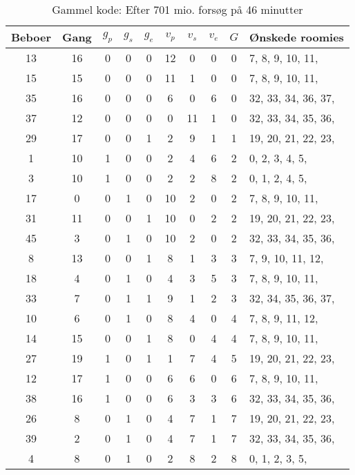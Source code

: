 \documentclass[article,oneside,11pt,a4paper]{memoir}
\newenvironment{assignment}[1]{
\begin{table}[h]
\caption{#1}
\footnotesize
\begin{center}
\begin{tabular}{cccccccccl}
\toprule
Beboer & Gang & $g_p$ & $g_s$ & $g_e$ & $v_p$ & $v_s$ & $v_e$ & $G$ & Ønskede roomies \\ \midrule
}{
\bottomrule
\end{tabular}
\end{center}
\end{table}

}
\begin{document}
\begin{assignment}{Gammel kode: Efter 701 mio. forsøg på 46 minutter}
    13 &   16 &   0 &   0 &   0 &  12 &   0 &   0 &  0 &   7,  8,  9, 10, 11, \\
    15 &   15 &   0 &   0 &   0 &  11 &   1 &   0 &  0 &   7,  8,  9, 10, 11, \\
    35 &   16 &   0 &   0 &   0 &   6 &   0 &   6 &  0 &  32, 33, 34, 36, 37, \\
    37 &   12 &   0 &   0 &   0 &   0 &  11 &   1 &  0 &  32, 33, 34, 35, 36, \\
    29 &   17 &   0 &   0 &   1 &   2 &   9 &   1 &  1 &  19, 20, 21, 22, 23, \\
     1 &   10 &   1 &   0 &   0 &   2 &   4 &   6 &  2 &   0,  2,  3,  4,  5, \\
     3 &   10 &   1 &   0 &   0 &   2 &   2 &   8 &  2 &   0,  1,  2,  4,  5, \\
    17 &    0 &   0 &   1 &   0 &  10 &   2 &   0 &  2 &   7,  8,  9, 10, 11, \\
    31 &   11 &   0 &   0 &   1 &  10 &   0 &   2 &  2 &  19, 20, 21, 22, 23, \\
    45 &    3 &   0 &   1 &   0 &  10 &   2 &   0 &  2 &  32, 33, 34, 35, 36, \\
     8 &   13 &   0 &   0 &   1 &   8 &   1 &   3 &  3 &   7,  9, 10, 11, 12, \\
    18 &    4 &   0 &   1 &   0 &   4 &   3 &   5 &  3 &   7,  8,  9, 10, 11, \\
    33 &    7 &   0 &   1 &   1 &   9 &   1 &   2 &  3 &  32, 34, 35, 36, 37, \\
    10 &    6 &   0 &   1 &   0 &   8 &   4 &   0 &  4 &   7,  8,  9, 11, 12, \\
    14 &   15 &   0 &   0 &   1 &   8 &   0 &   4 &  4 &   7,  8,  9, 10, 11, \\
    27 &   19 &   1 &   0 &   1 &   1 &   7 &   4 &  5 &  19, 20, 21, 22, 23, \\
    12 &   17 &   1 &   0 &   0 &   6 &   6 &   0 &  6 &   7,  8,  9, 10, 11, \\
    38 &   16 &   1 &   0 &   0 &   6 &   3 &   3 &  6 &  32, 33, 34, 35, 36, \\
    26 &    8 &   0 &   1 &   0 &   4 &   7 &   1 &  7 &  19, 20, 21, 22, 23, \\
    39 &    2 &   0 &   1 &   0 &   4 &   7 &   1 &  7 &  32, 33, 34, 35, 36, \\
     4 &    8 &   0 &   1 &   0 &   2 &   8 &   2 &  8 &   0,  1,  2,  3,  5, \\

\end{assignment}
\end{document}
